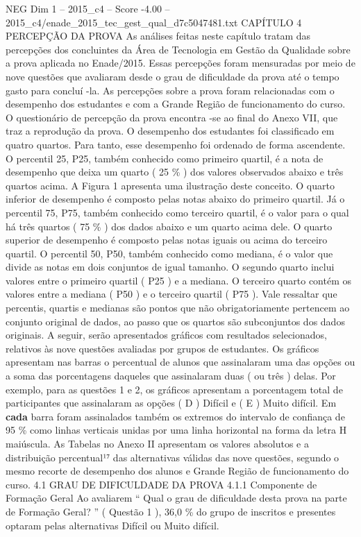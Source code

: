 \begin{textsample}{NEG Dim 1 – 2015\_c4 – Score -4.00 – 2015\_c4/enade\_2015\_tec\_gest\_qual\_d7c5047481.txt}  \label{ex:f1_neg_106}
CAPÍTULO 4 PERCEPÇÃO DA PROVA As análises feitas neste capítulo tratam das percepções dos concluintes da Área de Tecnologia em Gestão da Qualidade sobre a prova aplicada no Enade/2015.
Essas percepções foram mensuradas por meio de nove questões que avaliaram desde o grau de dificuldade da prova até o tempo gasto para concluí -la.
As percepções sobre a prova foram relacionadas com o desempenho dos estudantes e com a Grande Região de funcionamento do curso.
O questionário de percepção da prova encontra -se ao final do Anexo VII, que traz a reprodução da prova.
O desempenho dos estudantes foi classificado em quatro quartos.
Para tanto, esse desempenho foi ordenado de forma ascendente.
O percentil 25, P25, também conhecido como primeiro quartil, é a nota de desempenho que deixa um quarto ( 25 \% ) dos valores observados abaixo e três quartos acima.
A Figura 1 apresenta uma ilustração deste conceito.
O quarto inferior de desempenho é composto pelas notas abaixo do primeiro quartil.
Já o percentil 75, P75, também conhecido como terceiro quartil, é o valor para o qual há três quartos ( 75 \% ) dos dados abaixo e um quarto acima dele.
O quarto superior de desempenho é composto pelas notas iguais ou acima do terceiro quartil.
O percentil 50, P50, também conhecido como mediana, é o valor que divide as notas em dois conjuntos de igual tamanho.
O segundo quarto inclui valores entre o primeiro quartil ( P25 ) e a mediana.
O terceiro quarto contém os valores entre a mediana ( P50 ) e o terceiro quartil ( P75 ).
Vale ressaltar que percentis, quartis e medianas são pontos que não obrigatoriamente pertencem ao conjunto original de dados, ao passo que os quartos são subconjuntos dos dados originais.
A seguir, serão apresentados gráficos com resultados selecionados, relativos às nove questões avaliadas por grupos de estudantes.
Os gráficos apresentam nas barras o percentual de alunos que assinalaram uma das opções ou a soma das porcentagens daqueles que assinalaram duas ( ou três ) delas.
Por exemplo, para as questões 1 e 2, os gráficos apresentam a porcentagem total de participantes que assinalaram as opções ( D ) Difícil e ( E ) Muito difícil.
Em \textbf{cada} barra foram assinalados também os extremos do intervalo de confiança de 95 \% como linhas verticais unidas por uma linha horizontal na forma da letra H maiúscula.
As Tabelas no Anexo II apresentam os valores absolutos e a distribuição percentual¹⁷ das alternativas válidas das nove questões, segundo o mesmo recorte de desempenho dos alunos e Grande Região de funcionamento do curso. 4.1 GRAU DE DIFICULDADE DA PROVA 4.1.1 Componente de Formação Geral Ao avaliarem “ Qual o grau de dificuldade desta prova na parte de Formação Geral? ” ( Questão 1 ), 36,0 \% do grupo de inscritos e presentes optaram pelas alternativas Difícil ou Muito difícil.

\end{textsample}

